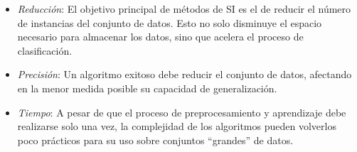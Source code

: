 \begin{itemize}
\item \emph{Reducción}: El objetivo principal de métodos de SI es el de reducir el número de instancias del conjunto de datos. Esto no solo disminuye el espacio necesario para almacenar los datos, sino que acelera el proceso de clasificación.
\item \emph{Precisión}: Un algoritmo exitoso debe reducir el conjunto de datos, afectando en la menor medida posible su capacidad de generalización.
\item \emph{Tiempo}: A pesar de que el proceso de preprocesamiento y aprendizaje debe realizarse solo una vez, la complejidad de los algoritmos pueden volverlos poco prácticos para su uso sobre conjuntos ``grandes'' de datos.
\end{itemize}
